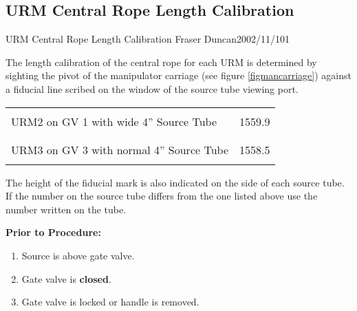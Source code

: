 \newpage
\subsection{URM Central Rope Length Calibration}
             {URM Central Rope Length Calibration}
             {Fraser Duncan}{2002/11/10}{1}

  The length calibration of the central rope for each URM is determined
by sighting the pivot of the manipulator carriage 
(see figure \ref{figmancarriage}) against a fiducial line scribed on the
window of the source tube viewing port. 


\begin{center}
\begin{tabular}{|l|c|}
\hline
   & \\
 URM2  on GV 1 with wide 4'' Source Tube & 1559.9 \\
  & \\
\hline
  & \\
 URM3  on GV 3 with normal 4'' Source Tube & 1558.5 \\
  & \\
\hline
\end{tabular}
\end{center}    


 The height of the fiducial
mark is also indicated on the side of each source tube.  If the number on the source tube
differs from the one listed above use the number written on the tube.





\noindent
{\bf Prior to Procedure:}
\begin{enumerate}
\item Source is above gate valve.
\item Gate valve is {\bf closed}.
\item Gate valve is locked or handle is removed.
\end{enumerate}

